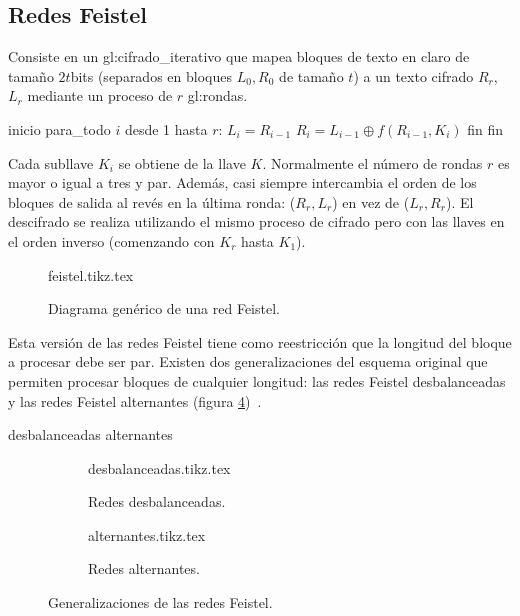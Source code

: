%
%

\subsection{Redes Feistel}
\label{sec:red_feistel}

Consiste en un \gls{gl:cifrado_iterativo} que mapea bloques de
texto en claro de tamaño $2t$bits (separados en bloques
$L_0, R_0$ de tamaño $t$) a un texto cifrado $R_r$, $L_r$
mediante un proceso de $r$ \glspl{gl:ronda}.

\begin{pseudocodigo}[caption={Feistel, cifrado.}, label={feistel:1}]
    inicio
    para_todo $i$ desde 1 hasta $r$:
      $L_i = R_{i-1}$
      $R_i = L_{i-1} \oplus f(R_{i-1}, K_i)$
    fin
    fin
\end{pseudocodigo}

Cada subllave $K_i$ se obtiene de la llave $K$. Normalmente el número de rondas
$r$ es mayor o igual a tres y par. Además, casi siempre intercambia el orden de
los bloques de salida al revés en la última ronda: ($R_r, L_r$) en vez de
($L_r, R_r$). El descifrado se realiza utilizando el mismo proceso de cifrado
pero con las llaves en el orden inverso (comenzando con $K_r$ hasta $K_1$).

\begin{figure}
  \begin{center}
    {feistel.tikz.tex}
    \caption{Diagrama genérico de una red Feistel.}
    \label{feistel}
  \end{center}
\end{figure}

Esta versión de las redes Feistel tiene como reestricción que la longitud
del bloque a procesar debe ser par. Existen dos generalizaciones del esquema
original que permiten procesar bloques de cualquier longitud: las redes Feistel
desbalanceadas y las redes Feistel alternantes (figura
\ref{feistel:generalizaciones})~\cite{sinopsis_rogaway}.

{desbalanceadas}
{alternantes}

\begin{figure}
  \centering
  \begin{subfigure}{0.45\textwidth}
    \begin{center}
      {desbalanceadas.tikz.tex}
      \caption{Redes desbalanceadas.}
      \label{feistel:desbalanceadas}
    \end{center}
  \end{subfigure}
  \begin{subfigure}{0.45\textwidth}
    \begin{center}
      {alternantes.tikz.tex}
      \caption{Redes alternantes.}
      \label{feistel:alternantes}
    \end{center}
  \end{subfigure}
  \caption{Generalizaciones de las redes Feistel.}
  \label{feistel:generalizaciones}
\end{figure}
